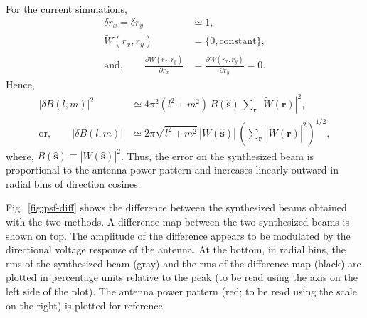 \documentclass[a4paper,fleqn,usenatbib]{../mnras}
\begin{document}
For the current simulations, 
\begin{align}
  \delta r_x = \delta r_y &\simeq 1, \\
  \widetilde{W}(r_x,r_y) &= \{0, \textrm{constant}\}, \\
  \textrm{and},\qquad \frac{\partial{\widetilde{W}(r_x,r_y)}}{\partial{r_x}} &= \frac{\partial{\widetilde{W}(r_x,r_y)}}{\partial{r_y}} = 0.
\end{align}
Hence,
\begin{align}
  \left|\delta B(l,m)\right|^2 &\simeq 4\pi^2\left(l^2+m^2\right)\,B(\hat{\mathbf{s}})\,\sum_\mathbf{r}\,\left|\widetilde{W}(\mathbf{r})\right|^2, \\
\textrm{or},\qquad \left|\delta B(l,m)\right| &\simeq 2\pi\sqrt{l^2+m^2}\,\left|W(\hat{\mathbf{s}})\right|\,\left(\sum_\mathbf{r}\,\left|\widetilde{W}(\mathbf{r})\right|^2\right)^{1/2}, \label{eqn:syn-beam-error}
\end{align}
where, $B(\hat{\mathbf{s}}) \equiv \left|W(\hat{\mathbf{s}})\right|^2$. Thus, 
the error on the synthesized beam is proportional to the antenna power pattern
and increases linearly outward in radial bins of direction cosines.

Fig.~\ref{fig:psf-diff} shows the difference between the synthesized beams 
obtained with the two methods. A difference map between the two synthesized 
beams is shown on top. The amplitude of the difference appears to be 
modulated by the directional voltage response of the antenna. At the bottom, 
in radial bins, the rms of the synthesized beam (gray) and the rms of the 
difference map (black) are plotted in percentage units relative to the peak 
(to be read using the axis on the left side of the plot). The antenna power 
pattern (red; to be read using the scale on the right) is plotted for reference. 
\end{document}
